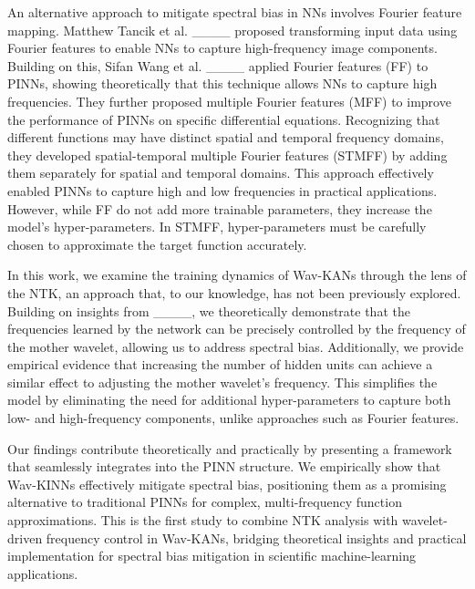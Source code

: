An alternative approach to mitigate spectral bias in NNs involves Fourier feature mapping. Matthew Tancik et al. ____ proposed transforming input data using Fourier features to enable NNs to capture high-frequency image components. Building on this, Sifan Wang et al. ____ applied Fourier features (FF) to PINNs, showing theoretically that this technique allows NNs to capture high frequencies. They further proposed multiple Fourier features (MFF) to improve the performance of PINNs on specific differential equations. Recognizing that different functions may have distinct spatial and temporal frequency domains, they developed spatial-temporal multiple Fourier features (STMFF) by adding them separately for spatial and temporal domains. This approach effectively enabled PINNs to capture high and low frequencies in practical applications. However, while FF do not add more trainable parameters, they increase the model's hyper-parameters. In STMFF, hyper-parameters must be carefully chosen to approximate the target function accurately.



In this work, we examine the training dynamics of Wav-KANs through the lens of the NTK, an approach that, to our knowledge, has not been previously explored. Building on insights from ____, we theoretically demonstrate that the frequencies learned by the network can be precisely controlled by the frequency of the mother wavelet, allowing us to address spectral bias. Additionally, we provide empirical evidence that increasing the number of hidden units can achieve a similar effect to adjusting the mother wavelet’s frequency. This simplifies the model by eliminating the need for additional hyper-parameters to capture both low- and high-frequency components, unlike approaches such as Fourier features.

Our findings contribute theoretically and practically by presenting a framework that seamlessly integrates into the PINN structure. We empirically show that Wav-KINNs effectively mitigate spectral bias, positioning them as a promising alternative to traditional PINNs for complex, multi-frequency function approximations. This is the first study to combine NTK analysis with wavelet-driven frequency control in Wav-KANs, bridging theoretical insights and practical implementation for spectral bias mitigation in scientific machine-learning applications.